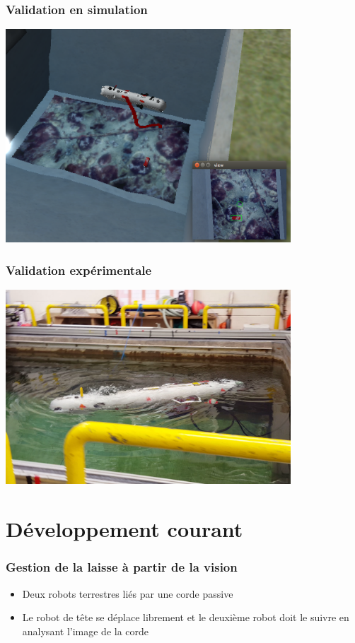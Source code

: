 \documentclass[10pt]{beamer}
\begin{document}
\begin{frame}
\frametitle{Validation en simulation}
\begin{center}
\href{run:videos/outUWSim_redbox_160422.mp4}{\includegraphics[width=0.8\textwidth, keepaspectratio]{Pictures/UWSim_nessie_redbox2.png}}
\end{center}
\end{frame}

\begin{frame}
\frametitle{Validation expérimentale}
\begin{center}
 \href{run:videos/video_OSL.mp4}{\includegraphics[width=0.8\textwidth]{Pictures/nessie2.png}}
\end{center}
\end{frame}

\section{Développement courant}

\begin{frame}
\frametitle{Gestion de la laisse à partir de la vision}
\begin{itemize}
\item Deux robots terrestres liés par une corde passive
\item Le robot de tête se déplace librement et le deuxième robot doit le suivre en analysant l'image de la corde
\end{itemize}
\end{frame}
\end{document}
